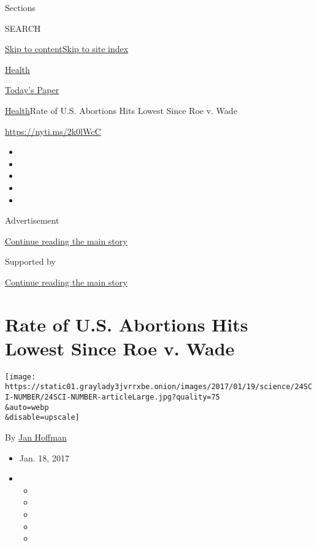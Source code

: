 Sections

SEARCH

\protect\hyperlink{site-content}{Skip to
content}\protect\hyperlink{site-index}{Skip to site index}

\href{https://www.nytimes3xbfgragh.onion/section/health}{Health}

\href{https://myaccount.nytimes3xbfgragh.onion/auth/login?response_type=cookie\&client_id=vi}{}

\href{https://www.nytimes3xbfgragh.onion/section/todayspaper}{Today's
Paper}

\href{/section/health}{Health}\textbar{}Rate of U.S. Abortions Hits
Lowest Since Roe v. Wade

\url{https://nyti.ms/2k0lWcC}

\begin{itemize}
\item
\item
\item
\item
\item
\end{itemize}

Advertisement

\protect\hyperlink{after-top}{Continue reading the main story}

Supported by

\protect\hyperlink{after-sponsor}{Continue reading the main story}

\hypertarget{rate-of-us-abortions-hits-lowest-since-roe-v-wade}{%
\section{Rate of U.S. Abortions Hits Lowest Since Roe v.
Wade}\label{rate-of-us-abortions-hits-lowest-since-roe-v-wade}}

\texttt{[image: https://static01.graylady3jvrrxbe.onion/images/2017/01/19/science/24SCI-NUMBER/24SCI-NUMBER-articleLarge.jpg?quality=75\\\&auto=webp\\\&disable=upscale]}

By \href{http://www.nytimes3xbfgragh.onion/by/jan-hoffman}{Jan Hoffman}

\begin{itemize}
\item
  Jan. 18, 2017
\item
  \begin{itemize}
  \item
  \item
  \item
  \item
  \item
  \end{itemize}
\end{itemize}

